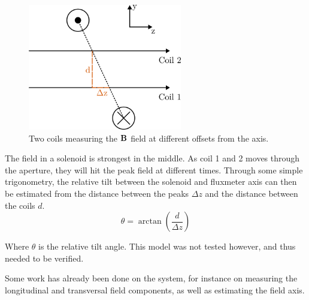 \begin{figure}[!h]
    \centering
    \includegraphics[width=0.6\textwidth]{figs/coil-dz}
    \caption{Two coils measuring the $\vb{B}$ field at different offsets
        from the axis.}
    \label{fig:coil-dz}
\end{figure}

The field in a solenoid is strongest in the middle. As coil 1
and 2 moves through the aperture, they will hit the peak field at different
times. Through some simple trigonometry, the relative tilt between the
solenoid and fluxmeter axis can then be estimated from the distance between
the peaks $\Delta z$ and the distance between the coils $d$.
\begin{equation}
    \theta = \arctan \left( \frac{d}{\Delta z} \right)
\end{equation}

Where $\theta$ is the relative tilt angle.
This model was not tested however, and thus needed to be verified.


Some work has already been done on the system, for instance on measuring
the longitudinal and transversal field components, as well as estimating
the field axis. \cite{petrone_induction-coil_2022}